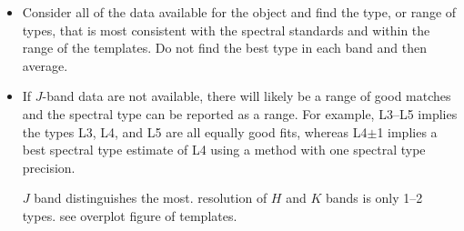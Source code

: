 \documentclass[12pt,preprint]{aastex}
\begin{document}

\begin{itemize}

\item Consider all of the data available for the object and find the type, or range of types, that is most consistent with the spectral standards and within the range of the templates. 
Do not find the best type in each band and then average.



\item If $J$-band data are not available, there will likely be a range of good matches and the spectral type can be reported as a range.  
For example, L3--L5 implies the types L3, L4, and L5 are all equally good fits, whereas L4$\pm$1 implies a best spectral type estimate of L4 using a method with one spectral type precision.

$J$ band distinguishes the most. resolution of $H$ and $K$ bands is only 1--2 types. see overplot figure of templates.

\end{itemize}
\end{document}
